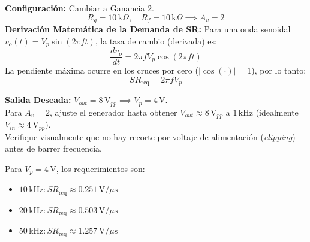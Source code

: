 \documentclass[11pt, a4paper]{article}
\begin{document}
\vspace{0.3cm}
\begin{minipage}{0.45\textwidth}
    \raggedright
    \textbf{Configuración:} Cambiar a Ganancia 2.
    \begin{equation*}
        R_g = 10\,\text{k}\Omega, \quad R_f = 10\,\text{k}\Omega \implies A_v = 2 \text{}
    \end{equation*}
    \textbf{Derivación Matemática de la Demanda de SR:}
    Para una onda senoidal $v_o(t) = V_p \sin(2\pi f t)$, la tasa de cambio (derivada) es:
    \begin{equation*}
        \frac{dv_o}{dt} = 2\pi f V_p \cos(2\pi f t) \text{}
    \end{equation*}
    La pendiente máxima ocurre en los cruces por cero ($|\cos(\cdot)| = 1$), por lo tanto:
    \begin{equation*}
        \boxed{ SR_{\mathrm{req}} = 2\pi f V_p } \text{}
    \end{equation*}
\end{minipage}
\hfill
\begin{minipage}{0.5\textwidth}
    \raggedright
    \textbf{Salida Deseada:} $V_{out} = 8\,\text{V}_{pp} \implies V_p = 4\,\text{V}$. \\
    Para $A_v=2$, ajuste el generador hasta obtener $V_{out} \approx 8\,\text{V}_{pp}$ a $1\,\text{kHz}$ (idealmente $V_{in} \approx 4\,\text{V}_{pp}$). \\
    Verifique visualmente que no hay recorte por voltaje de alimentación (\textit{clipping}) antes de barrer frecuencia.
    
    \vspace{0.2cm}
    Para $V_p = 4\,\text{V}$, los requerimientos son:
    \begin{itemize}
        \item $10\,\text{kHz}: SR_{\mathrm{req}} \approx 0.251\,\text{V}/\mu\text{s}$
        \item $20\,\text{kHz}: SR_{\mathrm{req}} \approx 0.503\,\text{V}/\mu\text{s}$
        \item $50\,\text{kHz}: SR_{\mathrm{req}} \approx 1.257\,\text{V}/\mu\text{s}$
    \end{itemize}
\end{minipage}
\end{document}
